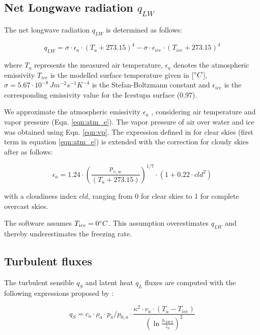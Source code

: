 \documentclass[utf8]{frontiersSCNS}
\begin{document}
\subsection{Net Longwave radiation \texorpdfstring{$q_{LW}$}{Lg}} \label{sec:LW}
The net longwave radiation $q_{LW}$ is determined as follows:

\begin{equation}
	q_{LW}= \sigma \cdot \epsilon_a \cdot {(T_a+ 273.15)}^4 -\sigma \cdot \epsilon_{ice} \cdot {(T_{ice}+ 273.15)}^4
	\label{eqn:LW}
\end{equation}

where $T_a$ represents the measured air temperature, $\epsilon_a$ denotes the atmospheric emissivity $T_{ice}$
is the modelled surface temperature given in [$\degree C$], $\sigma=5.67\cdot10^{-8}\,Jm^{-2}s^{-1}K^{-4}$ is
the Stefan-Boltzmann constant and $\epsilon_{ice}$ is the corresponding emissivity value for the Icestupa
surface (0.97).

We approximate the atmospheric emissivity $\epsilon_a$ ,
considering air temperature and vapor pressure (Eqn. \ref{eqn:atm_e}). The vapor pressure of air over water and
ice was obtained using Eqn. \ref{eqn:vp}.  The expression defined in \cite{brutsaertDerivableFormulaLongwave1975} for clear skies
(first term in equation \ref{eqn:atm_e}) is extended with the correction for cloudy skies after
\cite{brutsaertEvaporationAtmosphereTheory1982} as follows:

\begin{equation}
	\epsilon_a=1.24 \cdot (\frac{p_{v,w}}{(T_a+273.15)})^{1/7}\cdot(1+0.22\cdot{cld}^2) \label{eqn:atm_e}
\end{equation}

with a cloudiness index $cld$, ranging from 0 for clear skies to 1 for complete overcast skies. 

The software assumes $T_{ice} = 0 \degree C$. This assumption overestimates $q_{LW}$ and thereby underestimates
the freezing rate.

\subsection{Turbulent fluxes} \label{sec:Qs}

The turbulent sensible $q_{S}$ and latent heat $q_{L}$ fluxes are computed with the following expressions
proposed by \cite{garrattAtmosphericBoundaryLayer1992}:

\begin{equation}
	q_{S}= c_{a} \cdot \rho_{a} \cdot p_{a}/p_{0,a} \cdot \frac{\kappa^2 \cdot v_a \cdot
		(T_a-T_{ice})}{{(\ln{\frac{h_{AWS}}{z_{0}}})}^2}
	\label{eqn:qs}
\end{equation}
\end{document}
